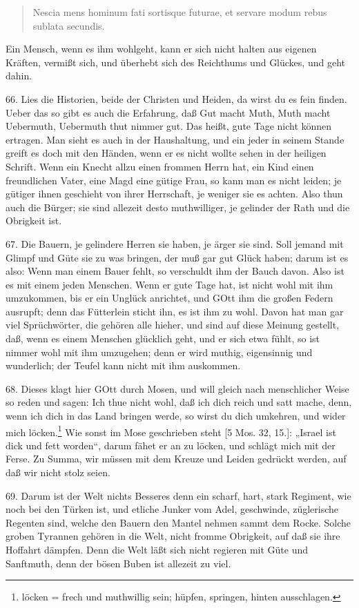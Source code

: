 \begin{quote}
Nescia mens hominum fati sortisque futurae, et servare modum rebus sublata secundis.
\end{quote}

Ein Mensch, wenn es ihm wohlgeht, kann er sich nicht halten aus eigenen Kräften, vermißt sich, und überhebt sich des Reichthums und Glückes, und geht dahin.

66. Lies die Historien, beide der Christen und Heiden, da wirst du es fein finden. Ueber das so gibt es auch die Erfahrung, daß Gut macht Muth, Muth macht Uebermuth, Uebermuth thut nimmer gut. Das heißt, gute Tage nicht können ertragen. Man sieht es auch in der Haushaltung, und ein jeder in seinem Stande greift es doch mit den Händen, wenn er es nicht wollte sehen in der heiligen Schrift. Wenn ein Knecht allzu einen frommen Herrn hat, ein Kind einen freundlichen Vater, eine Magd eine gütige Frau, so kann man es nicht leiden; je gütiger ihnen geschieht von ihrer Herrschaft, je weniger sie es achten. Also thun auch die Bürger; sie sind allezeit desto muthwilliger, je gelinder der Rath und die Obrigkeit ist.

67. Die Bauern, je gelindere Herren sie haben, je ärger sie sind. Soll jemand mit Glimpf und Güte sie zu was bringen, der muß gar gut Glück haben; darum ist es also: Wenn man einem Bauer fehlt, so verschuldt ihm der Bauch davon. Also ist es mit einem jeden Menschen. Wenn er gute Tage hat, ist nicht wohl mit ihm umzukommen, bis er ein Unglück anrichtet, und GOtt ihm die großen Federn ausrupft; denn das Fütterlein sticht ihn, es ist ihm zu wohl. Davon hat man gar viel Sprüchwörter, die gehören alle hieher, und sind auf diese Meinung gestellt, daß, wenn es einem Menschen glücklich geht, und er sich etwa fühlt, so ist nimmer wohl mit ihm umzugehen; denn er wird muthig, eigensinnig und wunderlich; der Teufel kann nicht mit ihm auskommen.

68. Dieses klagt hier GOtt durch Mosen, und will gleich nach menschlicher Weise so reden und sagen: Ich thue nicht wohl, daß ich dich reich und satt mache, denn, wenn ich dich in das Land bringen werde, so wirst du dich umkehren, und wider mich löcken.\footnote{löcken = frech und muthwillig sein; hüpfen, springen, hinten ausschlagen.} Wie sonst im Mose geschrieben steht [5 Mos. 32, 15.]: „Israel ist dick und fett worden“, darum fähet er an zu löcken, und schlägt mich mit der Ferse. Zu Summa, wir müssen mit dem Kreuze und Leiden gedrückt werden, auf daß wir nicht stolz seien.

69. Darum ist der Welt nichts Besseres denn ein scharf, hart, stark Regiment, wie noch bei den Türken ist, und etliche Junker vom Adel, geschwinde, züglerische Regenten sind, welche den Bauern den Mantel nehmen sammt dem Rocke. Solche groben Tyrannen gehören in die Welt, nicht fromme Obrigkeit, auf daß sie ihre Hoffahrt dämpfen. Denn die Welt läßt sich nicht regieren mit Güte und Sanftmuth, denn der bösen Buben ist allezeit zu viel.


